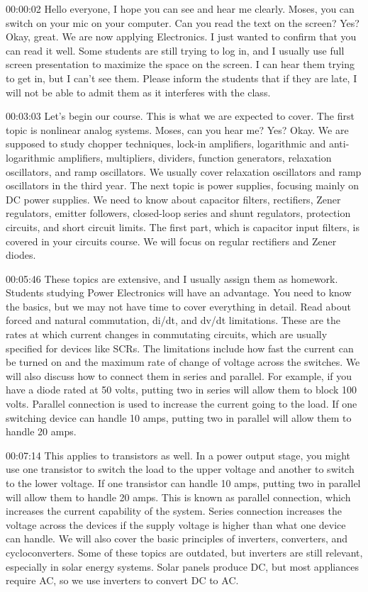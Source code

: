 00:00:02	Hello everyone, I hope you can see and hear me clearly. Moses, you can switch on your mic on your computer. Can you read the text on the screen? Yes? Okay, great. We are now applying Electronics. I just wanted to confirm that you can read it well. Some students are still trying to log in, and I usually use full screen presentation to maximize the space on the screen. I can hear them trying to get in, but I can't see them. Please inform the students that if they are late, I will not be able to admit them as it interferes with the class.

00:03:03	Let's begin our course. This is what we are expected to cover. The first topic is nonlinear analog systems. Moses, can you hear me? Yes? Okay. We are supposed to study chopper techniques, lock-in amplifiers, logarithmic and anti-logarithmic amplifiers, multipliers, dividers, function generators, relaxation oscillators, and ramp oscillators. We usually cover relaxation oscillators and ramp oscillators in the third year. The next topic is power supplies, focusing mainly on DC power supplies. We need to know about capacitor filters, rectifiers, Zener regulators, emitter followers, closed-loop series and shunt regulators, protection circuits, and short circuit limits. The first part, which is capacitor input filters, is covered in your circuits course. We will focus on regular rectifiers and Zener diodes.

00:05:46	These topics are extensive, and I usually assign them as homework. Students studying Power Electronics will have an advantage. You need to know the basics, but we may not have time to cover everything in detail. Read about forced and natural commutation, di/dt, and dv/dt limitations. These are the rates at which current changes in commutating circuits, which are usually specified for devices like SCRs. The limitations include how fast the current can be turned on and the maximum rate of change of voltage across the switches. We will also discuss how to connect them in series and parallel. For example, if you have a diode rated at 50 volts, putting two in series will allow them to block 100 volts. Parallel connection is used to increase the current going to the load. If one switching device can handle 10 amps, putting two in parallel will allow them to handle 20 amps.

00:07:14	This applies to transistors as well. In a power output stage, you might use one transistor to switch the load to the upper voltage and another to switch to the lower voltage. If one transistor can handle 10 amps, putting two in parallel will allow them to handle 20 amps. This is known as parallel connection, which increases the current capability of the system. Series connection increases the voltage across the devices if the supply voltage is higher than what one device can handle. We will also cover the basic principles of inverters, converters, and cycloconverters. Some of these topics are outdated, but inverters are still relevant, especially in solar energy systems. Solar panels produce DC, but most appliances require AC, so we use inverters to convert DC to AC.

